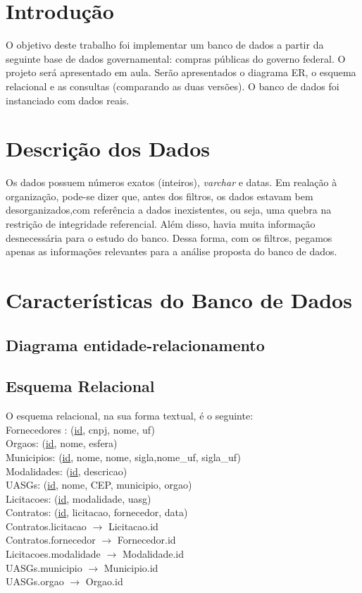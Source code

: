 \documentclass{article}
\begin{document}
\newpage

\newpage
{}
\section{Introdução}
O objetivo deste trabalho foi implementar um banco de dados a partir da seguinte base de dados
governamental: compras públicas do governo federal. O projeto será apresentado em aula. Serão apresentados o diagrama
ER, o esquema relacional e as consultas (comparando as duas versões). O banco de dados foi instanciado
com dados reais.
\section{Descrição dos Dados}
Os dados possuem números exatos (inteiros), \textit{varchar} e datas.
Em realação à organização, pode-se dizer que, antes dos filtros, os dados estavam bem
desorganizados,com referência a dados inexistentes, ou seja, uma quebra na restrição de integridade referencial.
Além disso, havia muita informação desnecessária para o estudo do banco. Dessa forma, com os filtros,
pegamos apenas as informações relevantes para a análise proposta do banco de dados. 
\section{Características do Banco de Dados}
\subsection{Diagrama entidade-relacionamento}
\begin{figure}[H]
  \centering
  
\end{figure}
\pagebreak
\subsection {Esquema Relacional}
\noindent
O esquema relacional, na sua forma textual, é o seguinte: \\[10pt]
Fornecedores : (\underline{id}, cnpj, nome, uf) \\
Orgaos: (\underline{id}, nome, esfera) \\
Municipios: (\underline{id}, nome, nome, sigla,nome\_uf, sigla\_uf) \\
Modalidades: (\underline{id}, descricao) \\
UASGs: (\underline{id}, nome, CEP, municipio, orgao) \\
Licitacoes: (\underline{id}, modalidade, uasg) \\
Contratos: (\underline{id}, licitacao, fornecedor, data) \\[5pt]
Contratos.licitacao $\rightarrow$ Licitacao.id \\
Contratos.fornecedor $\rightarrow$ Fornecedor.id \\
Licitacoes.modalidade $\rightarrow$ Modalidade.id \\
UASGs.municipio $\rightarrow$ Municipio.id \\
UASGs.orgao $\rightarrow$ Orgao.id
\end{document}
